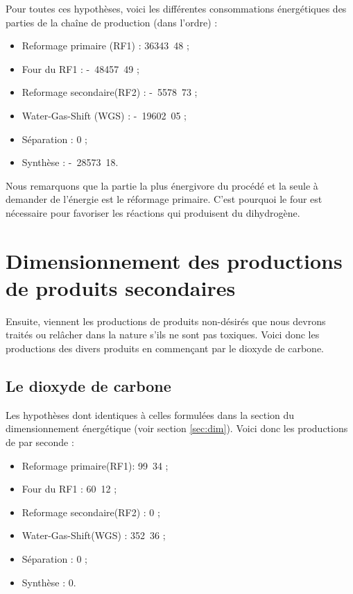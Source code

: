 Pour toutes ces hypothèses, voici les différentes consommations énergétiques des parties 
de la chaîne de production (dans l'ordre) :
\begin{itemize}
	\item Reformage primaire (RF1) : \unit{36343.48}{\kilo\joule} ;
	\item Four du RF1 : \unit{-48457.49}{\kilo\joule} ;
	\item Reformage secondaire(RF2) : \unit{-5578.73}{\kilo\joule} ;
	\item Water-Gas-Shift (WGS) : \unit{-19602.05}{\kilo\joule} ;
	\item Séparation : \unit{0}{\kilo\joule} ;
	\item Synthèse : \unit{-28573.18}{\kilo\joule}.
\end{itemize}
Nous remarquons que la partie la plus énergivore du procédé et la seule à demander de l'énergie 
est le réformage primaire. C'est pourquoi le four est nécessaire pour favoriser les réactions qui 
produisent du dihydrogène.

\section{Dimensionnement des productions de produits secondaires}
Ensuite, viennent les productions de produits non-désirés que nous devrons traités ou relâcher 
dans la nature s'ils ne sont pas toxiques. Voici donc les productions des divers produits en
commençant par le dioxyde de carbone.

\subsection{Le dioxyde de carbone}
Les hypothèses dont identiques à celles formulées dans la section du dimensionnement
énergétique (voir section \ref{sec:dim}). Voici donc les productions de  par seconde :

\begin{itemize}
	\item Reformage primaire(RF1): \unit{99.34}{\mole} ;
	\item Four du RF1 : \unit{60.12}{\mole} ;
	\item Reformage secondaire(RF2) : \unit{0}{\mole} ;
	\item Water-Gas-Shift(WGS) : \unit{352.36}{\mole} ;
	\item Séparation : \unit{0}{\mole} ;
	\item Synthèse : \unit{0}{\mole}.
\end{itemize}

